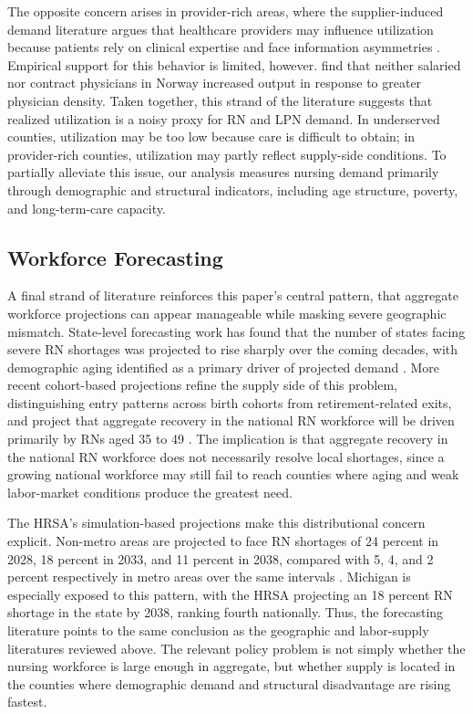 \documentclass[12pt]{article}
\begin{document}
The opposite concern arises in provider-rich areas, where the supplier-induced demand literature argues that healthcare providers may influence utilization because patients rely on clinical expertise and face information asymmetries \citep{evans1974}. Empirical support for this behavior is limited, however. \citet{grytten2001} find that neither salaried nor contract physicians in Norway increased output in response to greater physician density. Taken together, this strand of the literature suggests that realized utilization is a noisy proxy for RN and LPN demand. In underserved counties, utilization may be too low because care is difficult to obtain; in provider-rich counties, utilization may partly reflect supply-side conditions. To partially alleviate this issue, our analysis measures nursing demand primarily through demographic and structural indicators, including age structure, poverty, and long-term-care capacity.

\subsection{Workforce Forecasting}

A final strand of literature reinforces this paper's central pattern, that aggregate workforce projections can appear manageable while masking severe geographic mismatch. State-level forecasting work has found that the number of states facing severe RN shortages was projected to rise sharply over the coming decades, with demographic aging identified as a primary driver of projected demand \citep{juraschek2012,zhang2018}. More recent cohort-based projections refine the supply side of this problem, distinguishing entry patterns across birth cohorts from retirement-related exits, and project that aggregate recovery in the national RN workforce will be driven primarily by RNs aged 35 to 49 \citep{auerbach2024}. The implication is that aggregate recovery in the national RN workforce does not necessarily resolve local shortages, since a growing national workforce may still fail to reach counties where aging and weak labor-market conditions produce the greatest need.

The HRSA's simulation-based projections make this distributional concern explicit. Non-metro areas are projected to face RN shortages of 24 percent in 2028, 18 percent in 2033, and 11 percent in 2038, compared with 5, 4, and 2 percent respectively in metro areas over the same intervals \citep{hrsa2025}. Michigan is especially exposed to this pattern, with the HRSA projecting an 18 percent RN shortage in the state by 2038, ranking fourth nationally. Thus, the forecasting literature points to the same conclusion as the geographic and labor-supply literatures reviewed above. The relevant policy problem is not simply whether the nursing workforce is large enough in aggregate, but whether supply is located in the counties where demographic demand and structural disadvantage are rising fastest.
\end{document}
